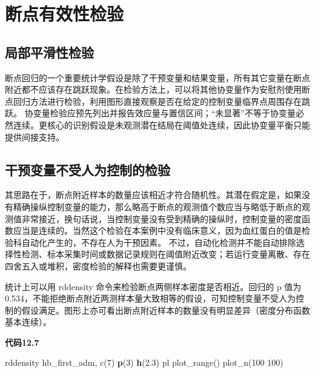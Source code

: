 \documentclass[
  chinese-hans,
  letterpaper,
  DIV=11,
  numbers=noendperiod]{scrreprt}
\newenvironment{Shaded}{\begin{snugshade}}{\end{snugshade}}
\newcommand{\KeywordTok}[1]{\textcolor[rgb]{0.00,0.23,0.31}{\textbf{#1}}}
\newcommand{\NormalTok}[1]{\textcolor[rgb]{0.00,0.23,0.31}{#1}}
\begin{document}
\section{断点有效性检验}\label{ux65adux70b9ux6709ux6548ux6027ux68c0ux9a8c}

\subsection{局部平滑性检验}\label{ux5c40ux90e8ux5e73ux6ed1ux6027ux68c0ux9a8c}

断点回归的一个重要统计学假设是除了干预变量和结果变量，所有其它变量在断点附近都不应该存在跳跃现象。在检验方法上，可以将其他协变量作为安慰剂使用断点回归方法进行检验，利用图形直接观察是否在给定的控制变量临界点周围存在跳跃。
协变量检验应预先列出并报告效应量与置信区间；``未显著''不等于协变量必然连续。更核心的识别假设是未观测潜在结局在阈值处连续，因此协变量平衡只能提供间接支持。

\subsection{干预变量不受人为控制的检验}\label{ux5e72ux9884ux53d8ux91cfux4e0dux53d7ux4ebaux4e3aux63a7ux5236ux7684ux68c0ux9a8c}

其思路在于，断点附近样本的数量应该相近才符合随机性。其潜在假定是，如果没有精确操纵控制变量的能力，那么略高于断点的观测值个数应当与略低于断点的观测值非常接近，换句话说，当控制变量没有受到精确的操纵时，控制变量的密度函数应当是连续的。当然这个检验在本案例中没有临床意义，因为血红蛋白的值是检验科自动化产生的，不存在人为干预因素。
不过，自动化检测并不能自动排除选择性检测、标本采集时间或数据记录规则在阈值附近改变；若运行变量离散、存在四舍五入或堆积，密度检验的解释也需要更谨慎。

统计上可以用 rddensity 命令来检验断点两侧样本密度是否相近。回归的 p 值为
0.534，不能拒绝断点附近两测样本量大致相等的假设，可知控制变量不受人为控制的假设满足。图形上亦可看出断点附近样本的数量没有明显差异（密度分布函数基本连续）。

\begin{tcolorbox}[enhanced jigsaw, arc=.35mm, bottomrule=.15mm, breakable, colback=white, colframe=quarto-callout-note-color-frame, left=2mm, leftrule=.75mm, opacityback=0, rightrule=.15mm, toprule=.15mm]

\vspace{-3mm}\textbf{代码12.7}\vspace{3mm}

\begin{Shaded}
\begin{Highlighting}[]
\NormalTok{rddensity hb\_first\_adm, c(7) }\KeywordTok{p}\NormalTok{(3) }\KeywordTok{h}\NormalTok{(2.3) pl plot\_range() plot\_n(100 100)}
\end{Highlighting}
\end{Shaded}

\end{tcolorbox}
\end{document}
